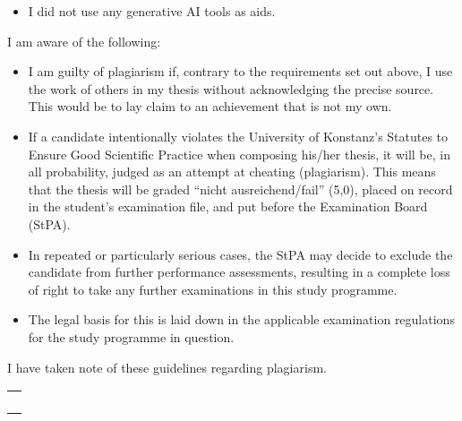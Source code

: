 {\begin{itemize}
        
    \item[\mbox{\begin{Form}\CheckBox[height=0.2cm, width=0.2cm]{}\end{Form}}]I did not use any generative AI tools as aids.
\end{itemize}





\thispagestyle{page2}

I am aware of the following:

\begin{itemize}[label=\color{kon4}---]
\item I am guilty of plagiarism if, contrary to the requirements set out above, I use the work of others in my thesis without acknowledging the precise source. This would be to lay claim to an achievement that is not my own.

\item If a candidate intentionally violates the University of Konstanz's Statutes to Ensure Good Scientific Practice when composing his/her thesis, it will be, in all probability, judged as an attempt at cheating (plagiarism). This means that the thesis will be graded \enquote{nicht ausreichend/fail} (5,0), placed on record in the student's examination file, and put before the Examination Board (StPA).

\item In repeated or particularly serious cases, the StPA may decide to exclude the candidate from further performance assessments, resulting in a complete loss of right to take any further examinations in this study programme.

\item The legal basis for this is laid down in the applicable examination regulations for the study programme in question.
\end{itemize}

I have taken note of these guidelines regarding plagiarism.

\vspace{0.75cm}

\begin{minipage}{0.3\textwidth}
    \begin{tabularx}{\textwidth}{|X|}
        \hline
        \\
        \\
        \\
        \\
        \hline
    \end{tabularx}


\end{minipage}}
